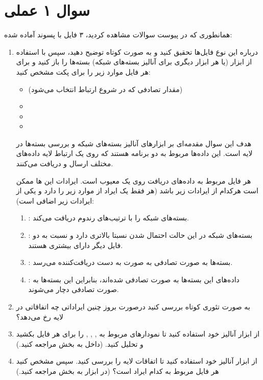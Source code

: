 \section*{سوال ۱ عملی}


همانطوری که در پیوست سوالات مشاهده کردید، ۳ فایل با پسوند  آماده شده:
\begin{enumerate}[label=\alph*)]

\item 
    درباره این نوع فایل‌ها تحقیق کنید و به صورت کوتاه توضیح دهید، سپس با استفاده از ابزار  (یا هر ابزار دیگری برای آنالیز بسته‌های شبکه) بسته‌ها را باز کنید و برای هر فایل موارد زیر را برای پکت  مشخص کنید:
    \begin{itemize}
        \item {} (مقدار تصادفی که در شروع ارتباط انتخاب می‌شود)  
        \item {}  
        \item {}  
        \item {}  
    \end{itemize}

هدف این سوال مقدمه‌ای بر ابزار‌های آنالیز بسته‌های شبکه و بررسی بسته‌ها در لایه  است.  
این داده‌ها مربوط به دو برنامه هستند که روی یک ارتباط لایه  داده‌های مختلف ارسال و دریافت می‌کنند.  

هر فایل مربوط به داده‌های دریافت روی یک  معیوب است.  
ایرادات این ها ممکن است هرکدام از ایرادات زیر باشد (هر  فقط یک ایراد از موارد زیر را دارد و یکی از ایرادات زیر اضافی است):
\begin{enumerate}
    \item {}: بسته‌های شبکه را با ترتیب‌های رندوم دریافت می‌کند.  
    \item {}: بسته‌های شبکه در این حالت احتمال  شدن نسبتا بالاتری دارد و نسبت به دو فایل دیگر دارای  بیشتری هستند.  
    \item {}: بسته‌ها به صورت تصادفی به صورت  به دست دریافت‌کننده می‌رسد.  
    \item {}: داده‌های این بسته‌ها به صورت تصادفی  شده‌اند، بنابراین این بسته‌ها به صورت تصادفی دچار  می‌شوند.
\end{enumerate}

\item 
 به صورت تئوری کوتاه بررسی کنید درصورت بروز چنین ایراداتی چه اتفاقاتی در لایه  رخ می‌دهد؟  

\item
 از ابزار آنالیز خود استفاده کنید تا نمودار‌های مربوط به , , ,  را برای هر فایل بکشید و تحلیل کنید. (داخل  به بخش  مراجعه کنید.)  
 
\item 
 از ابزار آنالیز خود استفاده کنید تا اتفاقات لایه  را بررسی کنید. سپس مشخص کنید هر فایل مربوط به کدام ایراد است؟ (در ابزار  به بخش  مراجعه کنید.)


\end{enumerate}